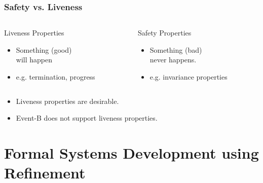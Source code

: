 \begin{frame}
  \frametitle{Safety vs. Liveness}

  \begin{columns}
    \begin{column}{0.45\textwidth}
      \begin{block}{Liveness Properties}
        \begin{itemize}
        \item Something (good) \\
          \quad \alert{will happen}
          \medskip
        \item e.g. termination, progress
        \end{itemize}
      \end{block}
    \end{column}
    \begin{column}{0.45\textwidth}
      \begin{block}{Safety Properties}
        \begin{itemize}
        \item Something (bad) \\
          \quad \alert{never happens}.
          \medskip
        \item e.g. invariance properties
        \end{itemize}
      \end{block}
    \end{column}
  \end{columns}

  \vspace{2ex}

  \pause
  \begin{itemize}
  \item Liveness properties are \alert{desirable}.
    \pause
    
    \smallskip
    \begin{center}
    \end{center}
    \pause
    \medskip
  \item Event-B does not support liveness properties.
  \end{itemize}

\end{frame}

\section{Formal Systems Development using Refinement}
\label{sec:form-syst-devel}

